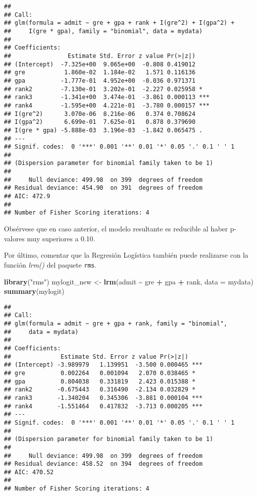 \documentclass[
]{article}
\newenvironment{Shaded}{\begin{snugshade}}{\end{snugshade}}
\newcommand{\AttributeTok}[1]{\textcolor[rgb]{0.13,0.29,0.53}{#1}}
\newcommand{\FunctionTok}[1]{\textcolor[rgb]{0.13,0.29,0.53}{\textbf{#1}}}
\newcommand{\NormalTok}[1]{#1}
\newcommand{\OtherTok}[1]{\textcolor[rgb]{0.56,0.35,0.01}{#1}}
\newcommand{\SpecialCharTok}[1]{\textcolor[rgb]{0.81,0.36,0.00}{\textbf{#1}}}
\newcommand{\StringTok}[1]{\textcolor[rgb]{0.31,0.60,0.02}{#1}}
\begin{document}
\begin{verbatim}
## 
## Call:
## glm(formula = admit ~ gre + gpa + rank + I(gre^2) + I(gpa^2) + 
##     I(gre * gpa), family = "binomial", data = mydata)
## 
## Coefficients:
##                Estimate Std. Error z value Pr(>|z|)    
## (Intercept)  -7.325e+00  9.065e+00  -0.808 0.419012    
## gre           1.860e-02  1.184e-02   1.571 0.116136    
## gpa          -1.777e-01  4.952e+00  -0.036 0.971371    
## rank2        -7.130e-01  3.202e-01  -2.227 0.025958 *  
## rank3        -1.341e+00  3.474e-01  -3.861 0.000113 ***
## rank4        -1.595e+00  4.221e-01  -3.780 0.000157 ***
## I(gre^2)      3.070e-06  8.216e-06   0.374 0.708624    
## I(gpa^2)      6.699e-01  7.625e-01   0.878 0.379690    
## I(gre * gpa) -5.888e-03  3.196e-03  -1.842 0.065475 .  
## ---
## Signif. codes:  0 '***' 0.001 '**' 0.01 '*' 0.05 '.' 0.1 ' ' 1
## 
## (Dispersion parameter for binomial family taken to be 1)
## 
##     Null deviance: 499.98  on 399  degrees of freedom
## Residual deviance: 454.90  on 391  degrees of freedom
## AIC: 472.9
## 
## Number of Fisher Scoring iterations: 4
\end{verbatim}

Obsérvese que en caso anterior, el modelo resultante es reducible al
haber p-valores muy superiores a 0.10.

Por último, comentar que la Regresión Logística también puede realizarse
con la función \emph{lrm()} del paquete \texttt{rms}.

\begin{Shaded}
\begin{Highlighting}[]
\FunctionTok{library}\NormalTok{(}\StringTok{"rms"}\NormalTok{)}
\NormalTok{mylogit\_new }\OtherTok{\textless{}{-}} \FunctionTok{lrm}\NormalTok{(admit }\SpecialCharTok{\textasciitilde{}}\NormalTok{ gre }\SpecialCharTok{+}\NormalTok{ gpa }\SpecialCharTok{+}\NormalTok{ rank, }\AttributeTok{data =}\NormalTok{ mydata)}
\FunctionTok{summary}\NormalTok{(mylogit)}
\end{Highlighting}
\end{Shaded}

\begin{verbatim}
## 
## Call:
## glm(formula = admit ~ gre + gpa + rank, family = "binomial", 
##     data = mydata)
## 
## Coefficients:
##              Estimate Std. Error z value Pr(>|z|)    
## (Intercept) -3.989979   1.139951  -3.500 0.000465 ***
## gre          0.002264   0.001094   2.070 0.038465 *  
## gpa          0.804038   0.331819   2.423 0.015388 *  
## rank2       -0.675443   0.316490  -2.134 0.032829 *  
## rank3       -1.340204   0.345306  -3.881 0.000104 ***
## rank4       -1.551464   0.417832  -3.713 0.000205 ***
## ---
## Signif. codes:  0 '***' 0.001 '**' 0.01 '*' 0.05 '.' 0.1 ' ' 1
## 
## (Dispersion parameter for binomial family taken to be 1)
## 
##     Null deviance: 499.98  on 399  degrees of freedom
## Residual deviance: 458.52  on 394  degrees of freedom
## AIC: 470.52
## 
## Number of Fisher Scoring iterations: 4
\end{verbatim}
\end{document}
